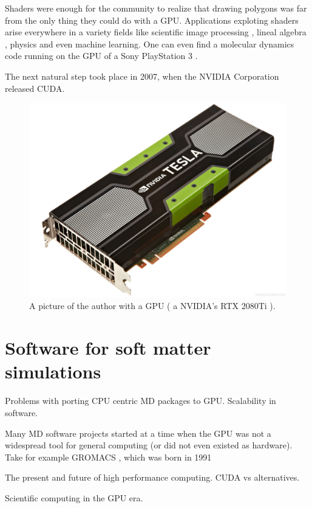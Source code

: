 \documentclass[ twoside,openright,titlepage,numbers=noenddot,%
headinclude,footinclude,cleardoublepage=empty,abstract=on,
BCOR=5mm,paper=a4,fontsize=11pt, dvipsnames
]{scrreprt}
\newcommand{\gpu}{\gls{GPU}\xspace}
\begin{document}
Shaders were enough for the community to realize that drawing polygons was far from the only thing they could do with a \gpu\cite{gpgpu2002}. Applications exploting shaders arise everywhere in a variety fields like scientific image processing \cite{gpuimage2003, gpuimage2006}, lineal algebra \cite{gpulinalg2001, gpulinalg2003a, gpulinalg2003b}, physics \cite{gpulbm2004} and even machine learning\cite{gpuml2005, gpuml1998}. One can even find a molecular dynamics code running on the \gpu of a Sony PlayStation 3 \cite{ps3md2009}.

The next natural step took place in 2007, when the NVIDIA Corporation released CUDA\cite{cuda}.
\begin{figure}
  \centering
  \includegraphics[width=\textwidth]{gpu_and_me}
  \caption{A picture of the author with a GPU ( a NVIDIA's RTX 2080Ti ).}
  \label{fig:gpuandme}
\end{figure}
\section{Software for soft matter simulations}
Problems with porting CPU centric \gls{MD} packages to \gpu. Scalability in software.

Many \gls{MD} software projects started at a time when the \gpu was not a widespread tool for general computing (or did not even existed as hardware). Take for example GROMACS \cite{gromacs}, which was born in 1991

The present and future of high performance computing.
CUDA vs alternatives.

Scientific computing in the GPU era.
\end{document}
